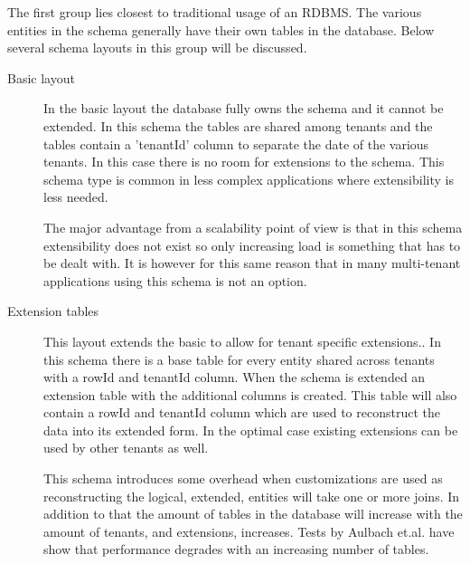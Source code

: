 The first group lies closest to traditional usage of an \ac{RDBMS}. 
The various entities in the schema generally have their own tables in the database.
Below several schema layouts in this group will be discussed.
\begin{description}
	\item[Basic layout] In the basic layout the database fully owns the schema and it cannot be extended. 
		In this schema the tables are shared among tenants and the tables contain a 'tenantId' column to separate the date of the various tenants.
		In this case there is no room for extensions to the schema. 
		This schema type is common in less complex applications where extensibility is less needed.~\cite{aulbach2008multi}
		
		The major advantage from a scalability point of view is that in this schema extensibility does not exist so only increasing load is something that has to be dealt with.
		It is however for this same reason that in many multi-tenant applications using this schema is not an option.
	\item[Extension tables]
		This layout extends the basic to allow for tenant specific extensions..
		In this schema there is a base table for every entity shared across tenants with a rowId and tenantId column.
		When the schema is extended an extension table with the additional columns is created.
		This table will also contain a rowId and tenantId column which are used to reconstruct the data into its extended form.
		In the optimal case existing extensions can be used by other tenants as well.

		This schema introduces some overhead when customizations are used as reconstructing the logical, extended, entities will take one or more joins. 
		In addition to that the amount of tables in the database will increase with the amount of tenants, and extensions, increases. Tests by Aulbach et.al. have show that performance degrades with an increasing number of tables.~\cite{aulbach2008multi}
\end{description}


